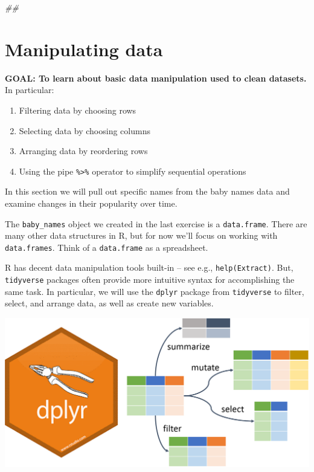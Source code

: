\documentclass[]{book}
\newenvironment{Shaded}{\begin{snugshade}}{\end{snugshade}}
\newcommand{\CommentTok}[1]{\textcolor[rgb]{0.56,0.35,0.01}{\textit{#1}}}
\providecommand{\tightlist}{%
  \setlength{\itemsep}{0pt}\setlength{\parskip}{0pt}}
\begin{document}
\begin{Shaded}
\begin{Highlighting}[]
\CommentTok{##}
\end{Highlighting}
\end{Shaded}

\hypertarget{manipulating-data}{%
\section{Manipulating data}\label{manipulating-data}}

\textbf{GOAL: To learn about basic data manipulation used to clean datasets.} In particular:

\begin{enumerate}
\def\labelenumi{\arabic{enumi}.}
\tightlist
\item
  Filtering data by choosing rows
\item
  Selecting data by choosing columns
\item
  Arranging data by reordering rows
\item
  Using the pipe \texttt{\%\textgreater{}\%} operator to simplify sequential operations
\end{enumerate}

In this section we will pull out specific names from the baby names data and examine changes in
their popularity over time.

The \texttt{baby\_names} object we created in the last exercise is a \texttt{data.frame}.
There are many other data structures in R, but for now we'll focus on
working with \texttt{data.frames}. Think of a \texttt{data.frame} as a spreadsheet.

R has decent data manipulation tools built-in -- see e.g.,
\texttt{help(Extract)}. But, \texttt{tidyverse} packages often provide
more intuitive syntax for accomplishing the same task. In
particular, we will use the \texttt{dplyr} package from \texttt{tidyverse}
to filter, select, and arrange data, as well as create new variables.

\includegraphics{R/Rintro/images/dplyr.png}
\end{document}
